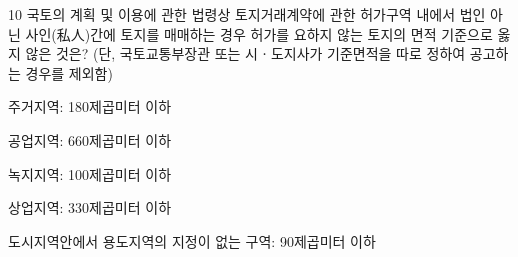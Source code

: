 \begin{question}{10}
국토의 계획 및 이용에 관한 법령상 토지거래계약에 관한 허가구역 내에서 법인 아닌 사인(私人)간에 토지를 매매하는 경우 허가를 요하지 않는 토지의 면적 기준으로 옳지 않은 것은? (단, 국토교통부장관 또는 시ㆍ도지사가 기준면적을 따로 정하여 공고하는 경우를 제외함)
\begin{choices}
  \item 주거지역: 180제곱미터 이하
  \item 공업지역: 660제곱미터 이하
  \item 녹지지역: 100제곱미터 이하
  \item 상업지역: 330제곱미터 이하
  \item 도시지역안에서 용도지역의 지정이 없는 구역: 90제곱미터 이하
\end{choices}
\end{question}
